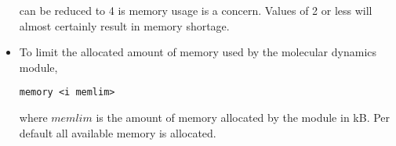 \begin{itemize}
can be reduced to 4 is memory usage is a concern. Values of 2 or less
will almost certainly result in memory shortage.
\item
To limit the allocated amount of memory used by the molecular dynamics
module,
\begin{verbatim}
memory <i memlim>
\end{verbatim}
where $memlim$ is the amount of memory allocated by the module in
kB. Per default all available memory is allocated.
\end{itemize}





